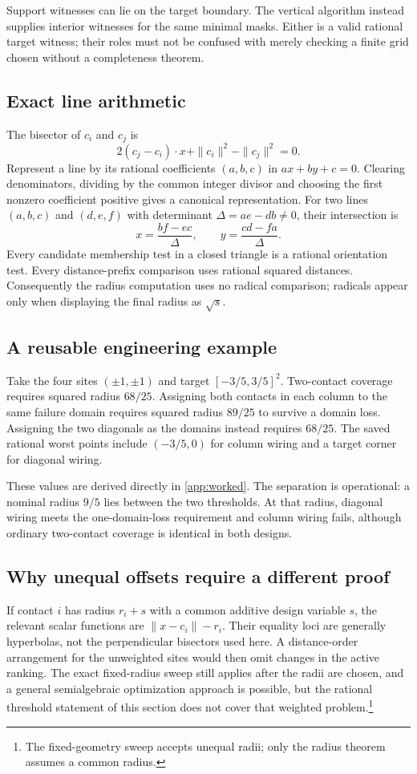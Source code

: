Support witnesses can lie on the target boundary. The vertical algorithm instead supplies interior witnesses for the same minimal masks. Either is a valid rational target witness; their roles must not be confused with merely checking a finite grid chosen without a completeness theorem.

\subsection{Exact line arithmetic}
The bisector of $c_i$ and $c_j$ is
\[
2(c_j-c_i)\cdot x+\|c_i\|^2-\|c_j\|^2=0.
\]
Represent a line by its rational coefficients $(a,b,c)$ in $ax+by+c=0$. Clearing denominators, dividing by the common integer divisor and choosing the first nonzero coefficient positive gives a canonical representation. For two lines $(a,b,c)$ and $(d,e,f)$ with determinant $\Delta=ae-db\ne0$, their intersection is
\[
x=\frac{bf-ec}{\Delta},\qquad y=\frac{cd-fa}{\Delta}.
\]
Every candidate membership test in a closed triangle is a rational orientation test. Every distance-prefix comparison uses rational squared distances. Consequently the radius computation uses no radical comparison; radicals appear only when displaying the final radius as $\sqrt s$.

\subsection{A reusable engineering example}
Take the four sites $(\pm1,\pm1)$ and target $[-3/5,3/5]^2$. Two-contact coverage requires squared radius $68/25$. Assigning both contacts in each column to the same failure domain requires squared radius $89/25$ to survive a domain loss. Assigning the two diagonals as the domains instead requires $68/25$. The saved rational worst points include $(-3/5,0)$ for column wiring and a target corner for diagonal wiring.

These values are derived directly in \cref{app:worked}. The separation is operational: a nominal radius $9/5$ lies between the two thresholds. At that radius, diagonal wiring meets the one-domain-loss requirement and column wiring fails, although ordinary two-contact coverage is identical in both designs.

\subsection{Why unequal offsets require a different proof}
If contact $i$ has radius $r_i+s$ with a common additive design variable $s$, the relevant scalar functions are $\|x-c_i\|-r_i$. Their equality loci are generally hyperbolas, not the perpendicular bisectors used here. A distance-order arrangement for the unweighted sites would then omit changes in the active ranking. The exact fixed-radius sweep still applies after the radii are chosen, and a general semialgebraic optimization approach is possible, but the rational threshold statement of this section does not cover that weighted problem.\footnote{The fixed-geometry sweep accepts unequal radii; only the radius theorem assumes a common radius.}

